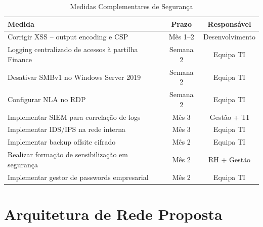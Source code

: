\documentclass[12pt, a4paper]{report}
\newcommand{\thead}[1]{\bfseries\small\color{white}#1}
\begin{document}
\begin{table}[H]
\centering
\caption{Medidas Complementares de Segurança}
\begin{tabularx}{\linewidth}{X c c}
\toprule
\rowcolor{TableHead}
\thead{Medida} & \thead{Prazo} & \thead{Responsável} \\
\midrule
Corrigir XSS -- output encoding e CSP & Mês 1--2 & Desenvolvimento \\
\rowcolor{TableAlt}
Logging centralizado de acessos à partilha Finance & Semana 2 & Equipa TI \\
Desativar SMBv1 no Windows Server 2019 & Semana 2 & Equipa TI \\
\rowcolor{TableAlt}
Configurar NLA no RDP & Semana 2 & Equipa TI \\
Implementar SIEM para correlação de logs & Mês 3 & Gestão + TI \\
\rowcolor{TableAlt}
Implementar IDS/IPS na rede interna & Mês 3 & Equipa TI \\
Implementar backup offsite cifrado & Mês 2 & Equipa TI \\
\rowcolor{TableAlt}
Realizar formação de sensibilização em segurança & Mês 2 & RH + Gestão \\
Implementar gestor de passwords empresarial & Mês 2 & Equipa TI \\
\bottomrule
\end{tabularx}
\end{table}

\section{Arquitetura de Rede Proposta}
\end{document}
